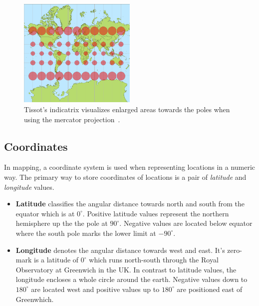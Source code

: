 \begin{figure}[h]
  \begin{center}
    \includegraphics[width=0.5\textwidth]{figures/tissot_mercator.png}
    \caption{Tissot's indicatrix visualizes enlarged areas towards the poles when using the mercator projection~\cite{wiki:mercator}.}
    \label{fig:mercator}
  \end{center}
\end{figure}


\subsection{Coordinates}

In mapping, a coordinate system is used when representing locations in a numeric way. The primary way to store coordinates of locations is a pair of \textit{latitude} and \textit{longitude} values. 

\begin{itemize}

\item \textbf{Latitude} classifies the angular distance towards north and south from the equator which is at $0^\circ$. Positive latitude values represent the northern hemisphere up the the pole at $90^\circ$. Negative values are located below equator where the south pole marks the lower limit at $-90^\circ$.

\item \textbf{Longitude} denotes the angular distance towards west and east. It's zero-mark is a latitude of $0^\circ$  which runs north-south through the Royal Observatory at Greenwich in the UK. In contrast to latitude values, the longitude encloses a whole circle around the earth. Negative values down to $180^\circ$ are located west and positive values up to $180^\circ$ are positioned east of Greenwhich.

\end{itemize}

